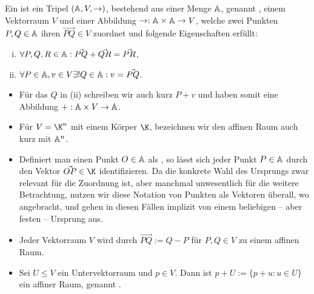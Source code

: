 \begin{df}
	Ein  ist ein Tripel $(\mathbb{A}, V, \rightarrow)$, bestehend aus einer Menge $\mathbb{A}$, genannt , einem Vektorraum $V$ und einer Abbildung $\rightarrow: \mathbb{A} \times \mathbb{A} \to V$, welche zwei Punkten $P, Q \in \mathbb{A}$ ihren  $\vec{PQ} \in V$ zuordnet und folgende Eigenschaften erfüllt:
	\begin{enumerate}[(i)]
		\item
			$\forall P, Q, R \in \mathbb{A} : \vec{PQ} + \vec{QR} = \vec{PR}$,
		\item
			$\forall P \in \mathbb{A}, v \in V \exists! Q \in \mathbb{A} : v = \vec{PQ}$.
	\end{enumerate}
	\begin{note}
		\begin{itemize}
			\item
				Für das $Q$ in (ii) schreiben wir auch kurz $P + v$ und haben somit eine Abbildung $+: \mathbb{A} \times V \to \mathbb{A}$.
			\item
				Für $V = \K^n$ mit einem Körper $\K$, bezeichnen wir den affinen Raum auch kurz mit $\mathbb{A}^n$.
			\item
				Definiert man einen Punkt $O \in \mathbb{A}$ als , so lässt sich jeder Punkt $P \in \mathbb{A}$ durch den Vektor $\vec{OP} \in \K$ identifizieren.
				Da die konkrete Wahl des Ursprungs zwar relevant für die Zuordnung ist, aber manchmal unwesentlich für die weitere Betrachtung, nutzen wir diese Notation von Punkten als Vektoren überall, wo angebracht, und gehen in diesen Fällen implizit von einem beliebigen – aber festen – Ursprung aus.
		\end{itemize}
	\end{note}
\end{df}

\begin{ex}
	\begin{itemize}
		\item
			Jeder Vektorraum $V$ wird durch $\vec{PQ} := Q - P$ für $P, Q \in V$ zu einem affinen Raum.
		\item
			Sei $U \le V$ ein Untervektorraum und $p \in V$.
			Dann ist $p + U := \{ p + u : u \in U \}$ ein affiner Raum, genannt .
	\end{itemize}
\end{ex}

